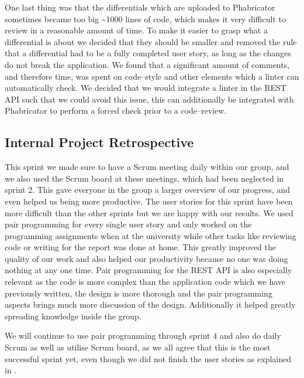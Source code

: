 One last thing was that the differentials which are uploaded to Phabricator sometimes became too big \textasciitilde 1000 lines of code, which makes it very difficult to review in a reasonable amount of time.
To make it easier to grasp what a differential is about we decided that they should be smaller and removed the rule that a differential had to be a fully completed user story, as long as the changes do not break the application.
We found that a significant amount of comments, and therefore time, was spent on code--style and other elements which a linter can automatically check.
We decided that we would integrate a linter in the REST API such that we could avoid this issue, this can additionally be integrated with Phabricator to perform a forced check prior to a code--review.

\subsection*{Internal Project Retrospective}
This sprint we made sure to have a Scrum meeting daily within our group, and we also used the Scrum board at these meetings, which had been neglected in sprint 2. 
This gave everyone in the group a larger overview of our progress, and even helped us being more productive. 
The user stories for this sprint have been more difficult than the other sprints but we are happy with our results.
We used pair programming for every single user story and only worked on the programming assignments when at the university while other tasks like reviewing code or writing for the report was done at home.
This greatly improved the quality of our work and also helped our productivity because no one was doing nothing at any one time.
Pair programming for the REST API is also especially relevant as the code is more complex than the application code which we have previously written, the design is more thorough and the pair programming aspects brings much more discussion of the design.
Additionally it helped greatly spreading knowledge inside the group.

We will continue to use pair programming through sprint 4 and also do daily Scrum as well as utilise Scrum board, as we all agree that this is the most successful sprint yet, even though we did not finish the user stories as explained in .

